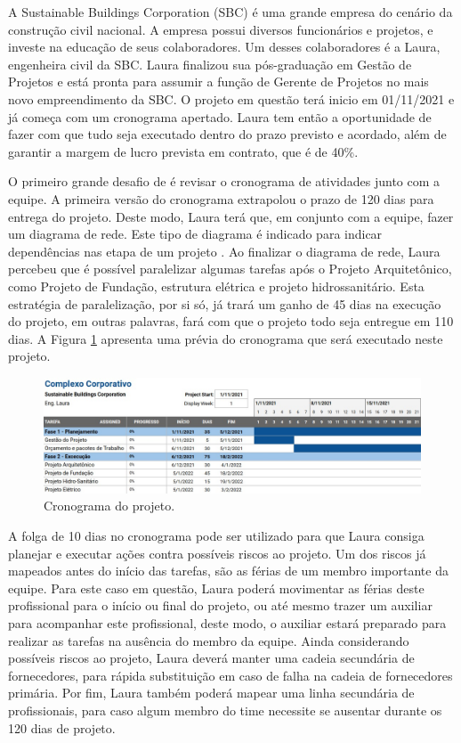 
A Sustainable Buildings Corporation (SBC) é uma grande empresa do cenário da construção civil nacional. A empresa possui diversos funcionários e projetos, e investe na educação de seus colaboradores. Um desses colaboradores é a Laura, engenheira civil da SBC. Laura finalizou sua pós-graduação em Gestão de Projetos e está pronta para assumir a função de Gerente de Projetos no mais novo empreendimento da SBC. O projeto em questão terá inicio em 01/11/2021 e já começa com um cronograma apertado. Laura tem então a oportunidade de fazer com que tudo seja executado dentro do prazo previsto e acordado, além de  garantir a margem de lucro prevista em contrato, que é de 40\%.


O primeiro grande desafio de é revisar o cronograma de atividades junto com a equipe. A primeira versão do cronograma extrapolou o prazo de 120 dias para entrega do projeto. Deste modo, Laura terá que, em conjunto com a equipe, fazer um diagrama de rede. Este tipo de diagrama é indicado para indicar dependências nas etapa de um projeto \cite{peinado2007administraccao}. Ao finalizar o diagrama de rede, Laura percebeu que é possível paralelizar algumas tarefas após o Projeto Arquitetônico, como Projeto de Fundação, estrutura elétrica e projeto hidrossanitário. Esta estratégia de paralelização, por si só, já trará um ganho de 45 dias na execução do projeto, em outras palavras, fará com que o projeto todo seja entregue em 110 dias. A Figura \ref{fig:cronograma} apresenta uma prévia do cronograma que será executado neste projeto.

\begin{figure}[!h]
    \includegraphics[scale=0.4]{fig/projeto.jpeg}
    \centering
    \caption{Cronograma do projeto.}
    \label{fig:cronograma}
\end{figure}

A folga de 10 dias no cronograma pode ser utilizado para que Laura consiga planejar e executar ações contra possíveis riscos ao projeto. Um dos riscos já mapeados antes do início das tarefas, são as férias de um membro importante da equipe. Para este caso em questão, Laura poderá movimentar as férias deste profissional para o início ou final do projeto, ou até mesmo trazer um auxiliar para acompanhar este profissional, deste modo, o auxiliar estará preparado para realizar as tarefas na ausência do membro da equipe. Ainda considerando possíveis riscos ao projeto, Laura deverá manter uma cadeia secundária de fornecedores, para rápida substituição em caso de falha na cadeia de fornecedores primária. Por fim, Laura também poderá mapear uma linha secundária de profissionais, para caso algum membro do time necessite se ausentar durante os 120 dias de projeto.

